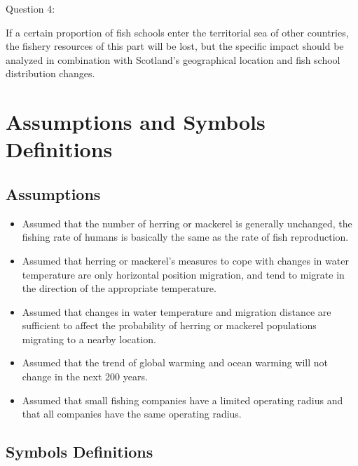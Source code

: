 \documentclass{mcmthesis}
\numberwithin{figure}{section}
\numberwithin{table}{section}
\begin{document}
Question 4:

If a certain proportion of fish schools enter the territorial sea of other countries, the fishery resources of this part will be lost, but the specific impact should be analyzed in combination with Scotland's geographical location and fish school distribution changes.
\section{Assumptions and Symbols Definitions}
\subsection{Assumptions}

\begin{itemize}
\item Assumed that the number of herring or mackerel is generally unchanged, the fishing rate of humans is basically the same as the rate of fish reproduction.
\item Assumed that herring or mackerel's measures to cope with changes in water temperature are only horizontal position migration, and tend to migrate in the direction of the appropriate temperature.

\item Assumed that changes in water temperature and migration distance are sufficient to affect the probability of herring or mackerel populations migrating to a nearby location.

\item Assumed that the trend of global warming and ocean warming will not change in the next 200 years.

\item Assumed that small fishing companies have a limited operating radius and that all companies have the same operating radius.

\end{itemize}

\subsection{Symbols Definitions}
\end{document}
